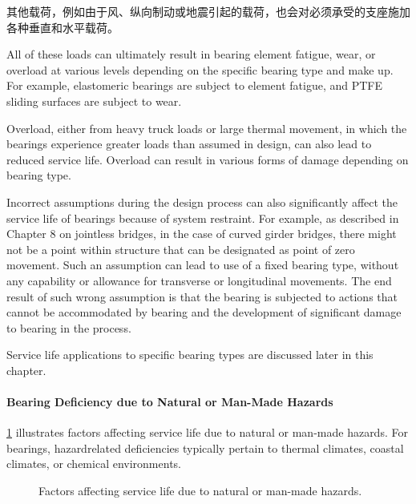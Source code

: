其他载荷，例如由于风、纵向制动或地震引起的载荷，也会对必须承受的支座施加各种垂直和水平载荷。

All of these loads can ultimately result in bearing element fatigue, wear, or overload at various levels depending
on the specific bearing type and make up. For example, elastomeric bearings are subject to element fatigue, and
PTFE sliding surfaces are subject to wear.

Overload, either from heavy truck loads or large thermal movement, in which the bearings experience greater
loads than assumed in design, can also lead to reduced service life. Overload can result in various forms of damage
depending on bearing type.

Incorrect assumptions during the design process can also significantly affect the service life of bearings because
of system restraint. For example, as described in Chapter 8 on jointless bridges, in the case of curved girder bridges,
there might not be a point within structure that can be designated as point of zero movement. Such an assumption can
lead to use of a fixed bearing type, without any capability or allowance for transverse or longitudinal movements.
The end result of such wrong assumption is that the bearing is subjected to actions that cannot be accommodated by
bearing and the development of significant damage to bearing in the process.

Service life applications to specific bearing types are discussed later in this chapter.

\paragraph{Bearing Deficiency due to Natural or Man-Made Hazards}

\cref{fig:faulttree-bearing-hazards} illustrates factors affecting service life due to natural or man-made hazards. For bearings, hazardrelated
deficiencies typically pertain to thermal climates, coastal climates, or chemical environments.

\begin{figure}
  \caption{Factors affecting service life due to natural or man-made hazards.}
  \label{fig:faulttree-bearing-hazards}
\end{figure}

